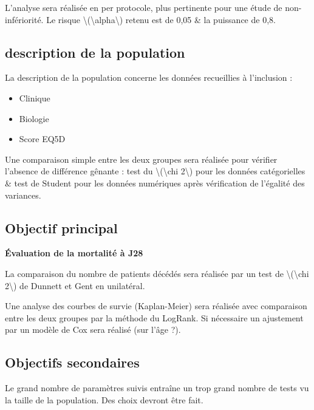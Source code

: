 L'analyse sera réalisée en per protocole, plus pertinente pour une étude
de non-infériorité. Le risque
{\textbackslash(\textbackslash alpha\textbackslash)} retenu est de 0,05
\& la puissance de 0,8.

\hypertarget{description-de-la-population}{%
\subsection{description de la
population}\label{description-de-la-population}}

La description de la population concerne les données recueillies à
l'inclusion :

\begin{itemize}
\tightlist
\item
  Clinique
\item
  Biologie
\item
  Score EQ5D
\end{itemize}

Une comparaison simple entre les deux groupes sera réalisée pour
vérifier l'absence de différence gênante : test du
{\textbackslash(\textbackslash chi 2\textbackslash)} pour les données
catégorielles \& test de Student pour les données numériques après
vérification de l'égalité des variances.

\hypertarget{objectif-principal}{%
\subsection{Objectif principal}\label{objectif-principal}}

\textbf{Évaluation de la mortalité à J28}

La comparaison du nombre de patients décédés sera réalisée par un test
de {\textbackslash(\textbackslash chi 2\textbackslash)} de Dunnett et
Gent en unilatéral.

Une analyse des courbes de survie (Kaplan-Meier) sera réalisée avec
comparaison entre les deux groupes par la méthode du LogRank. Si
nécessaire un ajustement par un modèle de Cox sera réalisé (sur l'âge
?).

\hypertarget{objectifs-secondaires}{%
\subsection{Objectifs secondaires}\label{objectifs-secondaires}}

Le grand nombre de paramètres suivis entraîne un trop grand nombre de
tests vu la taille de la population. Des choix devront être fait.

